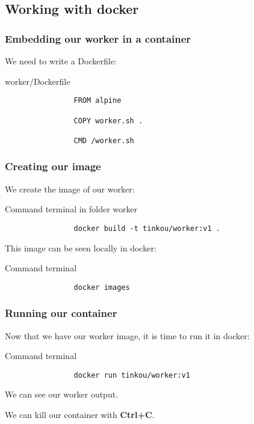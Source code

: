 \subsection{Working with docker}

	\begin{frame}[fragile]
		\frametitle{Embedding our worker in a container}
		
		We need to write a Dockerfile:
		
		\begin{block}{worker/Dockerfile}
			\begin{verbatim}
				FROM alpine

				COPY worker.sh .

				CMD /worker.sh
			\end{verbatim}
		\end{block}
	\end{frame}
	
	\begin{frame}[fragile]
		\frametitle{Creating our image}
		
		We create the image of our worker:
		
		\begin{block}{Command terminal in folder worker}
			\begin{verbatim}
				docker build -t tinkou/worker:v1 .
			\end{verbatim}
		\end{block}
		
		This image can be seen locally in docker:

		\begin{block}{Command terminal}
			\begin{verbatim}
				docker images
			\end{verbatim}
		\end{block}
		
	\end{frame}
	
	\begin{frame}[fragile]
		\frametitle{Running our container}
		
		Now that we have our worker image, it is time to run it in docker:
		
		\begin{block}{Command terminal}
			\begin{verbatim}
				docker run tinkou/worker:v1
			\end{verbatim}
		\end{block}
		We can see our worker output.
		
		We can kill our container with \textbf{Ctrl+C}.
		
	\end{frame}
	
